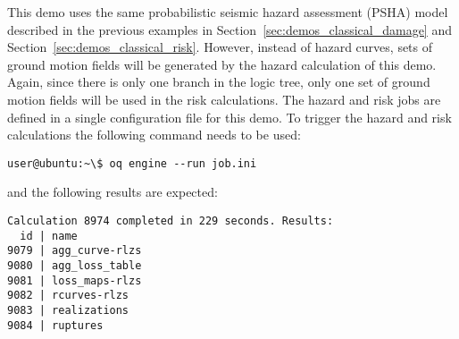 This demo uses the same probabilistic seismic hazard assessment (PSHA) model
described in the previous examples in Section~\ref{sec:demos_classical_damage}
and Section~\ref{sec:demos_classical_risk}. However, instead of hazard curves,
sets of ground motion fields will be generated by the hazard calculation of
this demo. Again, since there is only one branch in the logic tree, only one
set of ground motion fields will be used in the risk calculations. The hazard
and risk jobs are defined in a single configuration file for this demo. To
trigger the hazard and risk calculations the following command needs to be
used:

\begin{verbatim}
user@ubuntu:~\$ oq engine --run job.ini
\end{verbatim}

and the following results are expected:

\begin{verbatim}
Calculation 8974 completed in 229 seconds. Results:
  id | name
9079 | agg_curve-rlzs
9080 | agg_loss_table
9081 | loss_maps-rlzs
9082 | rcurves-rlzs
9083 | realizations
9084 | ruptures
\end{verbatim}
